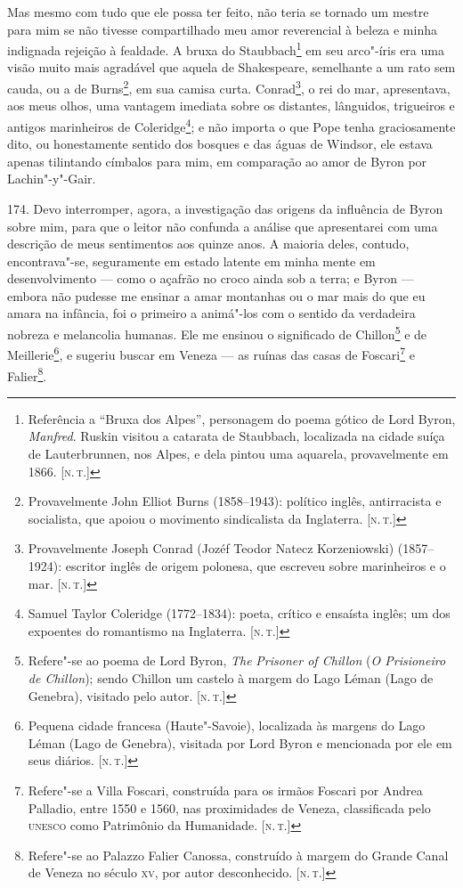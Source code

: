 Mas mesmo com tudo que ele possa ter feito, não teria se tornado um
mestre para mim se não tivesse compartilhado meu amor reverencial à
beleza e minha indignada rejeição à fealdade. A bruxa do
Staubbach\footnote{Referência a ``Bruxa dos Alpes'', personagem do poema
  gótico de Lord Byron, \emph{Manfred}. Ruskin visitou a catarata de
  Staubbach, localizada na cidade suíça de Lauterbrunnen, nos Alpes, e
  dela pintou uma aquarela, provavelmente em 1866. {[}\textsc{n.\,t.}{]}} em
seu arco"-íris era uma visão muito mais agradável que aquela de
Shakespeare, semelhante a um rato sem cauda, ou a de Burns\footnote{Provavelmente
  John Elliot Burns (1858--1943): político inglês, antirracista e
  socialista, que apoiou o movimento sindicalista da Inglaterra. {[}\textsc{n.\,t.}{]}}, em sua camisa curta. Conrad\footnote{Provavelmente Joseph
  Conrad (Jozéf Teodor Natecz Korzeniowski) (1857--1924): escritor inglês
  de origem polonesa, que escreveu sobre marinheiros e o mar. {[}\textsc{n.\,t.}{]}}, o rei do mar, apresentava, aos meus olhos, uma vantagem
imediata sobre os distantes, lânguidos, trigueiros e antigos marinheiros
de Coleridge\footnote{Samuel Taylor Coleridge (1772--1834): poeta,
  crítico e ensaísta inglês; um dos expoentes do romantismo na
  Inglaterra. {[}\textsc{n.\,t.}{]}}; e não importa o que Pope tenha
graciosamente dito, ou honestamente sentido dos bosques e das águas de
Windsor, ele estava apenas tilintando címbalos para mim, em comparação
ao amor de Byron por Lachin"-y"-Gair.

174. Devo interromper, agora, a investigação das origens da influência
de Byron sobre mim, para que o leitor não confunda a análise que
apresentarei com uma descrição de meus sentimentos aos quinze anos. A
maioria deles, contudo, encontrava"-se, seguramente em estado latente em
minha mente em desenvolvimento --- como o açafrão no croco ainda sob a
terra; e Byron --- embora não pudesse me ensinar a amar montanhas ou o
mar mais do que eu amara na infância, foi o primeiro a animá"-los com o
sentido da verdadeira nobreza e melancolia humanas. Ele me ensinou o
significado de Chillon\footnote{Refere"-se ao poema de Lord Byron,
  \emph{The} \emph{Prisoner of Chillon} (\emph{O Prisioneiro de
  Chillon}); sendo Chillon um castelo à margem do Lago Léman (Lago de
  Genebra), visitado pelo autor. {[}\textsc{n.\,t.}{]}} e de
Meillerie\footnote{Pequena cidade francesa (Haute"-Savoie), localizada às
  margens do Lago Léman (Lago de Genebra), visitada por Lord Byron e
  mencionada por ele em seus diários. {[}\textsc{n.\,t.}{]}}, e sugeriu buscar
em Veneza --- as ruínas das casas de Foscari\footnote{Refere"-se a Villa
  Foscari, construída para os irmãos Foscari por Andrea Palladio, entre
  1550 e 1560, nas proximidades de Veneza, classificada pelo \textsc{unesco} como
  Patrimônio da Humanidade. {[}\textsc{n.\,t.}{]}} e Falier\footnote{Refere"-se
  ao Palazzo Falier Canossa, construído à margem do Grande Canal de
  Veneza no século \textsc{xv}, por autor desconhecido. {[}\textsc{n.\,t.}{]}}.

